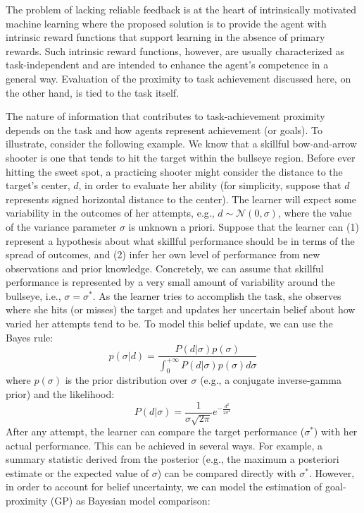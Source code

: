 The problem of lacking reliable feedback is at the heart of intrinsically motivated machine learning \cite{oudeyer_computational_2018,linke_adapting_2020} where the proposed solution is to provide the agent with intrinsic reward functions that support learning in the absence of primary rewards. Such intrinsic reward functions, however, are usually characterized as task-independent and are intended to enhance the agent's competence in a general way. Evaluation of the proximity to task achievement discussed here, on the other hand, is tied to the task itself.

The nature of information that contributes to task-achievement proximity depends on the task and how agents represent achievement (or goals). To illustrate, consider the following example. We know that a skillful bow-and-arrow shooter is one that tends to hit the target within the bullseye region. Before ever hitting the sweet spot, a practicing shooter might consider the distance to the target's center, $d$, in order to evaluate her ability (for simplicity, suppose that $d$ represents signed horizontal distance to the center). The learner will expect some variability in the outcomes of her attempts, e.g., $d \sim \mathcal{N}(0, \sigma)$, where the value of the variance parameter $\sigma$ is unknown a priori. Suppose that the learner can (1) represent a hypothesis about what skillful performance should be in terms of the spread of outcomes, and (2) infer her own level of performance from new observations and prior knowledge. Concretely, we can assume that skillful performance is represented by a very small amount of variability around the bullseye, i.e., $\sigma=\sigma^*$. As the learner tries to accomplish the task, she observes where she hits (or misses) the target and updates her uncertain belief about how varied her attempts tend to be. To model this belief update, we can use the Bayes rule:
\begin{equation}
    p(\sigma|d) = \frac{P(d|\sigma)p(\sigma)}{\int_{0}^{+\infty}P(d|\sigma)p(\sigma)d \sigma}
\end{equation}
where $p(\sigma)$ is the prior distribution over $\sigma$ (e.g., a conjugate inverse-gamma prior) and the likelihood:
\begin{equation}
    P(d|\sigma) = \frac{1}{\sigma \sqrt{2 \pi}}e^{-\frac{d^2}{2\sigma^2}}
\end{equation}
After any attempt, the learner can compare the target performance ($\sigma^*$) with her actual performance. This can be achieved in several ways. For example, a summary statistic derived from the posterior (e.g., the maximum a posteriori estimate or the expected value of $\sigma$) can be compared directly with $\sigma^*$. However, in order to account for belief uncertainty, we can model the estimation of goal-proximity ($\mathrm{GP}$) as Bayesian model comparison:

